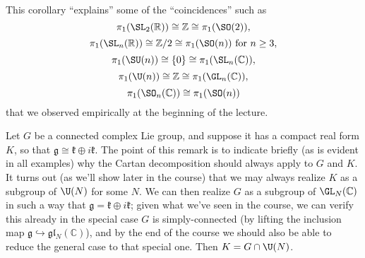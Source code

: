\documentclass[reqno]{amsart} 
\begin{document}
\begin{remark}
  This corollary ``explains'' some of the ``coincidences'' such as
  \begin{equation*}
    \pi_1(\SL_2(\mathbb{R})) \cong \mathbb{Z} \cong \pi_1(\SO(2)),
  \end{equation*}
  \begin{equation*}
    \pi_1(\SL_n(\mathbb{R})) \cong \mathbb{Z}/2 \cong \pi_1(\SO(n)) \text{ for } n \geq 3,
  \end{equation*}
  \begin{equation*}
    \pi_1(\SU(n)) \cong \{0\} \cong \pi_1(\SL_n(\mathbb{C})),
  \end{equation*}
  \begin{equation*}
    \pi_1(\U(n)) \cong \mathbb{Z} \cong \pi_1(\GL_n(\mathbb{C})),
  \end{equation*}
  \begin{equation*}
    \pi_1(\SO_n(\mathbb{C})) \cong \pi_1(\SO(n))
  \end{equation*}
  that we observed empirically at the beginning of the lecture.
\end{remark}

\begin{remark}
  Let $G$ be a connected complex Lie group, and suppose it has a compact real form $K$, so that $\mathfrak{g} \cong \mathfrak{k} \oplus i \mathfrak{k}$.  The point of this remark is to indicate briefly (as is evident in all examples) why the Cartan decomposition should always apply to $G$ and $K$.  It turns out (as we'll show later in the course) that we may always realize $K$ as a subgroup of $\U(N)$ for some $N$.  We can then realize $G$ as a subgroup of $\GL_N(\mathbb{C})$ in such a way that $\mathfrak{g} = \mathfrak{k} \oplus i \mathfrak{k}$; given what we've seen in the course, we can verify this already in the special case $G$ is simply-connected (by lifting the inclusion map $\mathfrak{g} \hookrightarrow \mathfrak{g} \mathfrak{l}_N(\mathbb{C})$), and by the end of the course we should also be able to reduce the general case to that special one.  Then $K = G \cap \U(N)$.
\end{remark}
\end{document}
